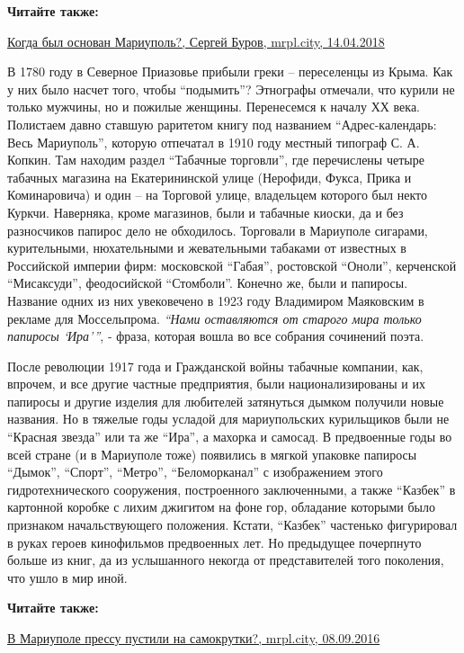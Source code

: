 \textbf{Читайте также:} 

\href{https://archive.org/details/14_04_2018.sergij_burov.mrpl_city.kogda_byl_osnovan_mariupol}{%
Когда был основан Мариуполь?, Сергей Буров, mrpl.city, 14.04.2018}

В 1780 году в Северное Приазовье прибыли греки – переселенцы из Крыма. Как у
них было насчет того, чтобы \enquote{подымить}? Этнографы отмечали, что курили не
только мужчины, но и пожилые женщины. Перенесемся к началу ХХ века. Полистаем
давно ставшую раритетом книгу под названием \enquote{Адрес-календарь: Весь Мариуполь},
которую отпечатал в 1910 году местный типограф С. А. Копкин. Там находим раздел
\enquote{Табачные торговли}, где перечислены четыре табачных магазина на Екатерининской
улице (Нерофиди, Фукса, Прика и Коминаровича) и один – на Торговой улице,
владельцем которого был некто Куркчи. Наверняка, кроме магазинов, были и
табачные киоски, да и без разносчиков папирос дело не обходилось. Торговали в
Мариуполе сигарами, курительными, нюхательными и жевательными табаками от
известных в Российской империи фирм: московской \enquote{Габая}, ростовской \enquote{Оноли},
керченской \enquote{Мисаксуди}, феодосийской \enquote{Стомболи}. Конечно же, были и папиросы.
Название одних из них увековечено в 1923 году Владимиром Маяковским в рекламе
для Моссельпрома. \emph{\enquote{Нами оставляются от старого мира только папиросы \enquote{Ира}}}, -
фраза, которая вошла во все собрания сочинений поэта.

После революции 1917 года и Гражданской войны табачные компании, как, впрочем,
и все другие частные предприятия, были национализированы и их папиросы и другие
изделия для любителей затянуться дымком получили новые названия. Но в тяжелые
годы усладой для мариупольских курильщиков были не \enquote{Красная звезда} или та же
\enquote{Ира}, а махорка и самосад. В предвоенные годы во всей стране (и в Мариуполе
тоже) появились в мягкой упаковке папиросы \enquote{Дымок}, \enquote{Спорт}, \enquote{Метро},
\enquote{Беломорканал} с изображением этого гидротехнического сооружения, построенного
заключенными, а также \enquote{Казбек} в картонной коробке с лихим джигитом на фоне
гор, обладание которыми было признаком начальствующего положения. Кстати,
\enquote{Казбек} частенько фигурировал в руках героев кинофильмов предвоенных лет. Но
предыдущее почерпнуто больше из книг, да из услышанного некогда от
представителей того поколения, что ушло в мир иной.

\textbf{Читайте также:} 

\href{https://mrpl.city/news/view/v-mariupole-pressu-pustili-na-samokrutki--foto-}{%
В Мариуполе прессу пустили на самокрутки?, mrpl.city, 08.09.2016}

